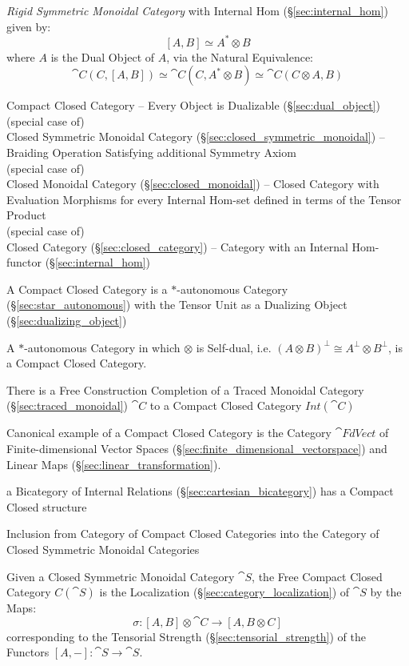 \emph{Rigid Symmetric Monoidal Category} with Internal Hom
(\S\ref{sec:internal_hom}) given by:
\[
  [A,B] \simeq A^* \otimes B
\]
where $A$ is the Dual Object of $A$, via the Natural Equivalence:
\[
  \cat{C}(C,[A,B]) \simeq \cat{C}(C,A^* \otimes B)
    \simeq \cat{C}(C \otimes A, B)
\]

Compact Closed Category -- Every Object is Dualizable
(\S\ref{sec:dual_object}) \\
(special case of) \\
Closed Symmetric Monoidal Category
(\S\ref{sec:closed_symmetric_monoidal})
-- Braiding Operation Satisfying additional Symmetry Axiom \\
(special case of) \\
Closed Monoidal Category (\S\ref{sec:closed_monoidal}) -- Closed
Category with Evaluation Morphisms for every Internal Hom-set defined
in terms of the Tensor Product \\
(special case of) \\
Closed Category (\S\ref{sec:closed_category}) -- Category with an
Internal Hom-functor (\S\ref{sec:internal_hom})

A Compact Closed Category is a $*$-autonomous Category
(\S\ref{sec:star_autonomous}) with the Tensor Unit as a Dualizing
Object (\S\ref{sec:dualizing_object})

A $*$-autonomous Category in which $\otimes$ is Self-dual, i.e. $(A
\otimes B)^\bot \cong A^\bot \otimes B^\bot$, is a Compact Closed
Category. \cite{abramsky-gay-nagarajan96}

There is a Free Construction Completion of a Traced Monoidal Category
(\S\ref{sec:traced_monoidal}) $\cat{C}$ to a Compact Closed Category
$Int(\cat{C})$

Canonical example of a Compact Closed Category is the Category
$\cat{FdVect}$ of Finite-dimensional Vector Spaces
(\S\ref{sec:finite_dimensional_vectorspace}) and Linear Maps
(\S\ref{sec:linear_transformation}).

a Bicategory of Internal Relations (\S\ref{sec:cartesian_bicategory}) has a
Compact Closed structure

Inclusion from Category of Compact Closed Categories into the Category
of Closed Symmetric Monoidal Categories

Given a Closed Symmetric Monoidal Category $\cat{S}$, the Free Compact
Closed Category $C(\cat{S})$ is the Localization
(\S\ref{sec:category_localization}) of $\cat{S}$ by the Maps:
\[
  \sigma:[A,B] \otimes \cat{C} \rightarrow [A,B \otimes C]
\]
corresponding to the Tensorial Strength
(\S\ref{sec:tensorial_strength}) of the Functors $[A,-]: \cat{S}
\rightarrow \cat{S}$.

